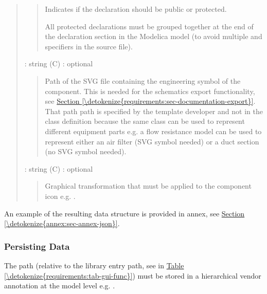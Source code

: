 \documentclass[letterpaper,10pt, openany,english]{sphinxmanual}
\begin{document}
\begin{quote}
\begin{quote}
\begin{DUlineblock}{0em}
\item[] Indicates if the declaration should be public or protected.
\item[] All protected declarations must be grouped together at the end of the declaration section in the Modelica model (to avoid multiple  and  specifiers in the source file).
\end{DUlineblock}
\end{quote}

 : string (C) : optional
\begin{quote}

Path of the SVG file containing the engineering symbol of the component. This is needed for the schematics export functionality, see \hyperref[\detokenize{requirements:sec-documentation-export}]{Section \ref{\detokenize{requirements:sec-documentation-export}}}. That path path is specified by the template developer and not in the class definition because the same class can be used to represent different equipment parts e.g. a flow resistance model can be used to represent either an air filter (SVG symbol needed) or a duct section (no SVG symbol needed).
\end{quote}

 : string (C) : optional
\begin{quote}

Graphical transformation that must be applied to the component icon e.g. .
\end{quote}
\end{quote}

An example of the resulting data structure is provided in annex, see \hyperref[\detokenize{annex:sec-annex-json}]{Section \ref{\detokenize{annex:sec-annex-json}}}.


\subsubsection{Persisting Data}
\label{\detokenize{requirements:persisting-data}}\label{\detokenize{requirements:sec-persisting-data}}

The path (relative to the library entry path, see  in \hyperref[\detokenize{requirements:tab-gui-func}]{Table \ref{\detokenize{requirements:tab-gui-func}}}) must be stored in a hierarchical vendor annotation at the model level e.g. .
\end{document}

